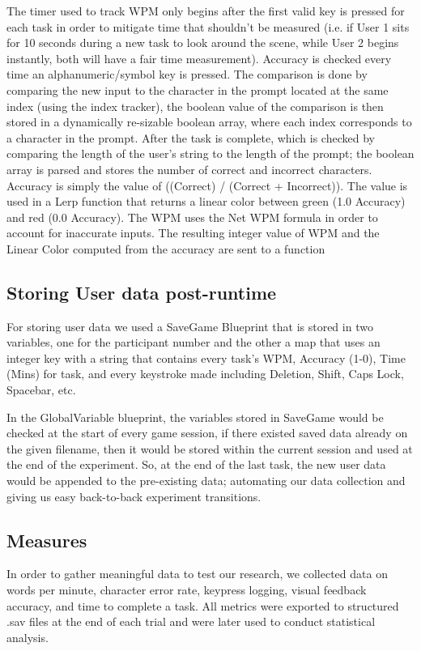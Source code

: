 \documentclass[acmlarge]{acmart}
\begin{document}
The timer used to track WPM only begins after the first valid key is pressed for each task in order to mitigate time that shouldn't be measured (i.e. if User 1 sits for 10 seconds during a new task to look around the scene, while User 2 begins instantly, both will have a fair time measurement). Accuracy is checked every time an alphanumeric/symbol key is pressed. The comparison is done by comparing the new input to the character in the prompt  located at the same index (using the index tracker), the boolean value of the comparison is then stored in a dynamically re-sizable boolean array, where each index corresponds to a character in the prompt. After the task is complete, which is checked by comparing the length of the user's string to the length of the prompt; the boolean array is parsed and stores the number of correct and incorrect characters. Accuracy is simply the value of ((Correct) / (Correct + Incorrect)). The value is used in a Lerp function that returns a linear color between green (1.0 Accuracy) and red (0.0 Accuracy). The WPM uses the Net WPM formula in order to account for inaccurate inputs. The resulting integer value of WPM and the Linear Color computed from the accuracy are sent to a function 

\subsection{Storing User data post-runtime}
For storing user data we used a SaveGame Blueprint that is stored in two variables, one for the participant number and the other a map that uses an integer key with a string that contains every task's WPM, Accuracy (1-0), Time (Mins) for task, and every keystroke made including Deletion, Shift, Caps Lock, Spacebar, etc. 
 
In the GlobalVariable blueprint, the variables stored in SaveGame would be checked at the start of every game session, if there existed saved data already on the given filename, then it would be stored within the current session and used at the end of the experiment. So, at the end of the last task, the new user data would be appended to the pre-existing data; automating our data collection and giving us easy back-to-back experiment transitions.

\subsection{Measures}

In order to gather meaningful data to test our research, we collected data on words per minute, character error rate, keypress logging, visual feedback accuracy, and time to complete a task. All metrics were exported to structured .sav files at the end of each trial and were later used to conduct statistical analysis. 
\end{document}
